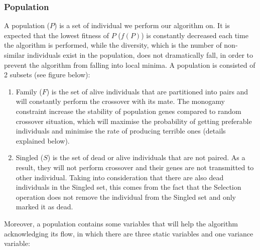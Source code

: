 \documentclass[final]{elsarticle}
\begin{document}
\subsubsection{Population}

A population ($P$) is a set of individual we perform our algorithm on. It is expected that the lowest fitness of $P$ ($f(P)$) is constantly decreased each time the algorithm is performed, while the diversity, which is the number of non-similar individuals exist in the population, does not dramatically fall, in order to prevent the algorithm from falling into local minima. A population is consisted of 2 subsets (see figure below):
\begin{enumerate}
	\item Family ($F$) is the set of alive individuals that are partitioned into pairs and will constantly perform the crossover with its mate. The monogamy constraint increase the stability of population genes compared to random crossover situation, which will maximise the probability of getting preferable individuals and minimise the rate of producing terrible ones (details explained below).
	\item Singled ($S$) is the set of dead or alive individuals that are not paired. As a result, they will not perform crossover and their genes are not transmitted to other individual. Taking into consideration that there are also dead individuals in the Singled set, this comes from the fact that the Selection operation does not remove the individual from the Singled set and only marked it as dead.
	
\end{enumerate}
Moreover, a population contains some variables that will help the algorithm acknowledging its flow, in which there are three static variables and one variance variable:
\end{document}
